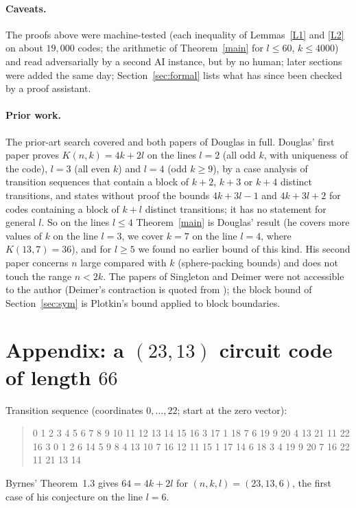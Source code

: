 \documentclass[11pt]{article}
\theoremstyle{remark}
\begin{document}
\paragraph{Caveats.} The proofs above were machine-tested (each inequality of Lemmas~\ref{L1} and \ref{L2} on about $19{,}000$ codes;
the arithmetic of Theorem~\ref{main} for $l\le 60$, $k\le 4000$) and read adversarially by a second AI instance, but by no human; later sections were added the same day; Section~\ref{sec:formal} lists what has since been checked by a proof assistant.
\paragraph{Prior work.} The prior-art search covered \cite{B1,B2} and both papers of Douglas \cite{Do} in full.
Douglas' first paper proves $K(n,k)=4k+2l$ on the lines $l=2$ (all odd $k$, with uniqueness of the code), $l=3$ (all even $k$)
and $l=4$ (odd $k\ge 9$), by a case analysis of transition sequences that contain a block of $k+2$, $k+3$ or $k+4$ distinct
transitions, and states without proof the bounds $4k+3l-1$ and $4k+3l+2$ for codes containing a block of $k+l$ distinct transitions;
it has no statement for general $l$. So on the lines $l\le 4$ Theorem~\ref{main} is Douglas' result (he covers more values of $k$
on the line $l=3$, we cover $k=7$ on the line $l=4$, where $K(13,7)=36$), and for $l\ge 5$ we found no earlier bound of this kind.
His second paper concerns $n$ large compared with $k$ (sphere-packing bounds) and does not touch the range $n<2k$.
The papers of Singleton and Deimer were not accessible to the author (Deimer's contraction is quoted from \cite{B2});
the block bound of Section~\ref{sec:sym} is Plotkin's bound applied to block boundaries.

\appendix
\section*{Appendix: a $(23,13)$ circuit code of length $66$}
Transition sequence (coordinates $0,\dots,22$; start at the zero vector):
\begin{quote}\small\raggedright
0 1 2 3 4 5 6 7 8 9 10 11 12 13 14 15 16 3 17 1 18 7 6 19 9 20 4 13 21 11 22 16 3
0 1 2 6 14 5 9 8 4 13 10 7 16 12 11 15 1 17 14 6 18 3 4 19 9 20 7 16 22 11 21 13 14
\end{quote}
Byrnes' Theorem~1.3 gives $64=4k+2l$ for $(n,k,l)=(23,13,6)$, the first case of his conjecture on the line $l=6$.
\end{document}
